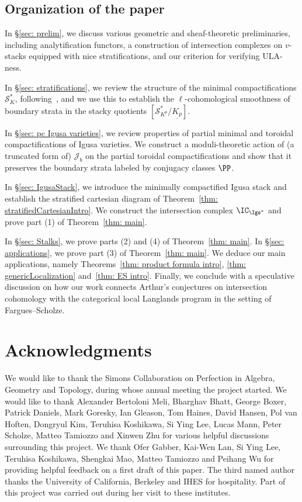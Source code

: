 \documentclass[letterpaper,11pt]{amsart}
\begin{document}
\subsection{Organization of the paper} In \S\ref{sec: prelim}, we discuss various geometric and sheaf-theoretic preliminaries, including analytification functors, a construction of intersection complexes on $v$-stacks equipped with nice stratifications, and our criterion for verifying ULA-ness. 

In \S\ref{sec: stratifications}, we review the structure of the minimal compactifications $\mathcal{S}^*_{K}$, following~\cite{PinkHigherDirectImages}, and we use this to establish the $\ell$-cohomological smoothness of boundary strata in the stacky quotients $[\mathcal{S}^*_{K^p}/\underline{K_p}]$.

In \S\ref{sec: pc Igusa varieties}, we review properties of partial minimal and toroidal compactifications of Igusa varieties. We construct a moduli-theoretic action of (a truncated form of) $\mathcal{J}_b$ on the partial toroidal compactifications and show that it preserves the boundary strata labeled by conjugacy classes $\PP$.  

In \S\ref{sec: IgusaStack}, we introduce the minimally compactified Igusa stack and establish the stratified cartesian diagram of Theorem~\ref{thm: stratifiedCartesianIntro}. We construct the intersection complex $\IC_{\Igs^*}$ and prove part (1) of Theorem~\ref{thm: main}.  

In \S\ref{sec: Stalks}, we prove parts (2) and (4) of Theorem~\ref{thm: main}. In \S\ref{sec: applications}, we prove part (3) of Theorem~\ref{thm: main}. We deduce our main applications, namely Theorems~\ref{thm: product formula intro}, \ref{thm: genericLocalization} and~\ref{thm: ES intro}. Finally, we conclude with a speculative discussion on how our work connects Arthur's conjectures on intersection cohomology with the categorical local Langlands program in the setting of Fargues--Scholze. 



\section*{Acknowledgments}
We would like to thank the Simons Collaboration on Perfection in Algebra, Geometry and Topology, during whose annual meeting the project started. We would like to thank Alexander Bertoloni Meli, Bharghav Bhatt, George Boxer, Patrick Daniels, Mark Goresky, Ian Gleason, Tom Haines, David Hansen, Pol van Hoften,  Dongryul Kim, Teruhisa Koshikawa, Si Ying Lee, Lucas Mann, Peter Scholze, Matteo Tamiozzo and Xinwen Zhu for various helpful discussions surrounding this project. We thank Ofer Gabber, Kai-Wen Lan, Si Ying Lee,  Teruhisa Koshikawa, Shengkai Mao, Matteo Tamiozzo and Peihang Wu for providing helpful feedback on a first draft of this paper. The third named author thanks the University of California, Berkeley and IHES for hospitality. Part of this project was carried out during her visit to these institutes.
\end{document}
